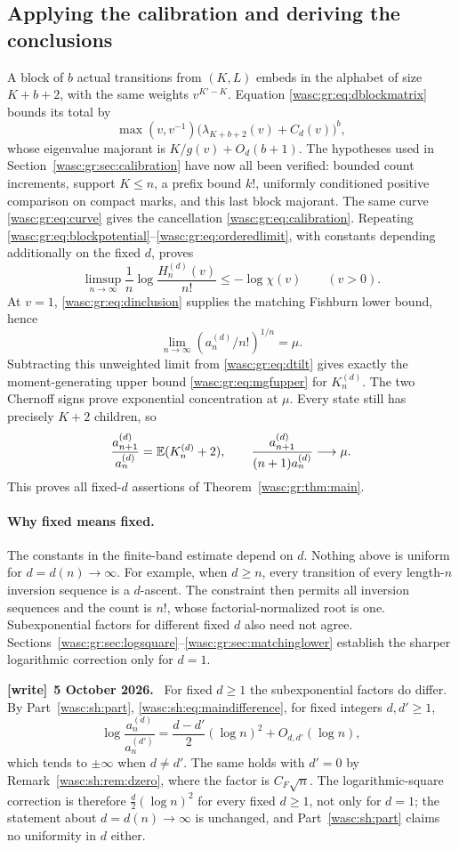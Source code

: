 \documentclass[11pt,a4paper]{article}
\theoremstyle{remark}\newtheorem{remark}[theorem]{Remark}
\numberwithin{equation}{section}
\newenvironment{writenote}[1][]{\par\smallskip\begingroup\small
 \noindent\textbf{[write]}\if\relax\detokenize{#1}\relax\else~\textbf{#1.}\fi\ }%
 {\par\endgroup\smallskip}
\begin{document}
\subsection{Applying the calibration and deriving the conclusions}
A block of $b$ actual transitions from $(K,L)$ embeds in the alphabet of size $K+b+2$, with the same weights $v^{K'-K}$. Equation \eqref{wasc:gr:eq:dblockmatrix} bounds its total by
\[
\max(v,v^{-1})\bigl(\lambda_{K+b+2}(v)+C_d(v)\bigr)^b,
\]
whose eigenvalue majorant is $K/g(v)+O_d(b+1)$. The hypotheses used in Section~\ref{wasc:gr:sec:calibration} have now all been verified: bounded count increments, support $K\le n$, a prefix bound $k!$, uniformly conditioned positive comparison on compact marks, and this last block majorant. The same curve \eqref{wasc:gr:eq:curve} gives the cancellation \eqref{wasc:gr:eq:calibration}. Repeating \eqref{wasc:gr:eq:blockpotential}--\eqref{wasc:gr:eq:orderedlimit}, with constants depending additionally on the fixed $d$, proves
\begin{equation}\label{wasc:gr:eq:dtilt}
\limsup_{n\to\infty}\frac1n\log\frac{H_n^{(d)}(v)}{n!}
\le-\log\chi(v)\qquad(v>0).
\end{equation}
At $v=1$, \eqref{wasc:gr:eq:dinclusion} supplies the matching Fishburn lower bound, hence
\[
\lim_{n\to\infty}(a_n^{(d)}/n!)^{1/n}=\mu.
\]
Subtracting this unweighted limit from \eqref{wasc:gr:eq:dtilt} gives exactly the moment-generating upper bound \eqref{wasc:gr:eq:mgfupper} for $K_n^{(d)}$. The two Chernoff signs prove exponential concentration at $\mu$. Every state still has precisely $K+2$ children, so
\[
\frac{a_{n+1}^{(d)}}{a_n^{(d)}}=\mathbb E(K_n^{(d)}+2),\qquad
\frac{a_{n+1}^{(d)}}{(n+1)a_n^{(d)}}\longrightarrow\mu.
\]
This proves all fixed-$d$ assertions of Theorem~\ref{wasc:gr:thm:main}.

\paragraph{Why fixed means fixed.}
The constants in the finite-band estimate depend on $d$. Nothing above is uniform for $d=d(n)\to\infty$. For example, when $d\ge n$, every transition of every length-$n$ inversion sequence is a $d$-ascent. The constraint then permits all inversion sequences and the count is $n!$, whose factorial-normalized root is one. Subexponential factors for different fixed $d$ also need not agree. Sections~\ref{wasc:gr:sec:logsquare}--\ref{wasc:gr:sec:matchinglower} establish the sharper logarithmic correction only for $d=1$.
\begin{writenote}[5 October 2026]
For fixed $d\ge1$ the subexponential factors do differ. By Part~\ref{wasc:sh:part}, \eqref{wasc:sh:eq:maindifference}, for fixed integers $d,d'\ge1$,
\[
\log\frac{a_n^{(d)}}{a_n^{(d')}}=\frac{d-d'}2(\log n)^2+O_{d,d'}(\log n),
\]
which tends to $\pm\infty$ when $d\ne d'$. The same holds with $d'=0$ by Remark~\ref{wasc:sh:rem:dzero}, where the factor is $C_F\sqrt n$. The logarithmic-square correction is therefore $\frac d2(\log n)^2$ for every fixed $d\ge1$, not only for $d=1$; the statement about $d=d(n)\to\infty$ is unchanged, and Part~\ref{wasc:sh:part} claims no uniformity in $d$ either.
\end{writenote}
\end{document}
